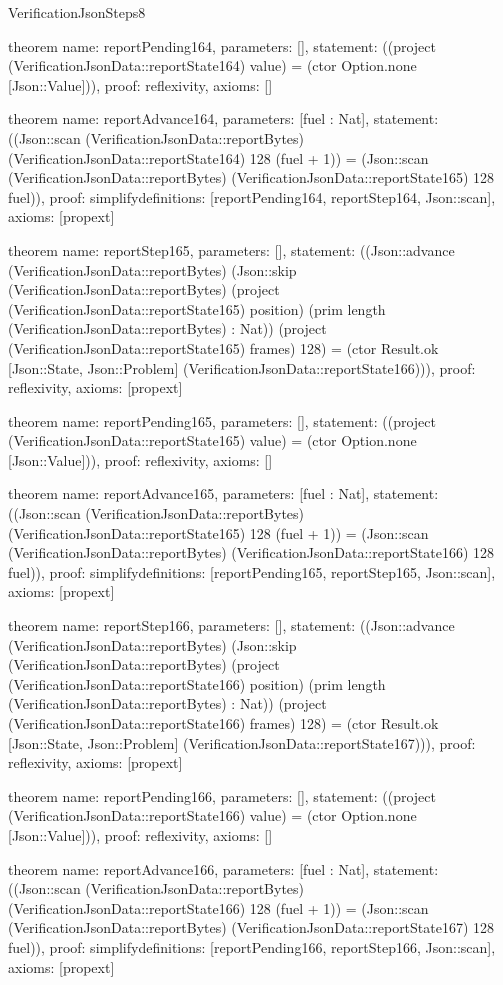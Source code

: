 \begin{lexlean}{VerificationJsonSteps8}
\begin{semanticmodule}
theorem{
  name: reportPending164,
  parameters: [],
  statement: ((project (VerificationJsonData::reportState164) value) = (ctor Option.none [Json::Value])),
  proof: reflexivity{},
  axioms: []
}

theorem{
  name: reportAdvance164,
  parameters: [fuel : Nat],
  statement: ((Json::scan (VerificationJsonData::reportBytes) (VerificationJsonData::reportState164) 128 (fuel + 1)) = (Json::scan (VerificationJsonData::reportBytes) (VerificationJsonData::reportState165) 128 fuel)),
  proof: simplify{definitions: [reportPending164, reportStep164, Json::scan]},
  axioms: [propext]
}

theorem{
  name: reportStep165,
  parameters: [],
  statement: ((Json::advance (VerificationJsonData::reportBytes) (Json::skip (VerificationJsonData::reportBytes) (project (VerificationJsonData::reportState165) position) (prim length (VerificationJsonData::reportBytes) : Nat)) (project (VerificationJsonData::reportState165) frames) 128) = (ctor Result.ok [Json::State, Json::Problem] (VerificationJsonData::reportState166))),
  proof: reflexivity{},
  axioms: [propext]
}

theorem{
  name: reportPending165,
  parameters: [],
  statement: ((project (VerificationJsonData::reportState165) value) = (ctor Option.none [Json::Value])),
  proof: reflexivity{},
  axioms: []
}

theorem{
  name: reportAdvance165,
  parameters: [fuel : Nat],
  statement: ((Json::scan (VerificationJsonData::reportBytes) (VerificationJsonData::reportState165) 128 (fuel + 1)) = (Json::scan (VerificationJsonData::reportBytes) (VerificationJsonData::reportState166) 128 fuel)),
  proof: simplify{definitions: [reportPending165, reportStep165, Json::scan]},
  axioms: [propext]
}

theorem{
  name: reportStep166,
  parameters: [],
  statement: ((Json::advance (VerificationJsonData::reportBytes) (Json::skip (VerificationJsonData::reportBytes) (project (VerificationJsonData::reportState166) position) (prim length (VerificationJsonData::reportBytes) : Nat)) (project (VerificationJsonData::reportState166) frames) 128) = (ctor Result.ok [Json::State, Json::Problem] (VerificationJsonData::reportState167))),
  proof: reflexivity{},
  axioms: [propext]
}

theorem{
  name: reportPending166,
  parameters: [],
  statement: ((project (VerificationJsonData::reportState166) value) = (ctor Option.none [Json::Value])),
  proof: reflexivity{},
  axioms: []
}

theorem{
  name: reportAdvance166,
  parameters: [fuel : Nat],
  statement: ((Json::scan (VerificationJsonData::reportBytes) (VerificationJsonData::reportState166) 128 (fuel + 1)) = (Json::scan (VerificationJsonData::reportBytes) (VerificationJsonData::reportState167) 128 fuel)),
  proof: simplify{definitions: [reportPending166, reportStep166, Json::scan]},
  axioms: [propext]
}


\end{semanticmodule}
\end{lexlean}
